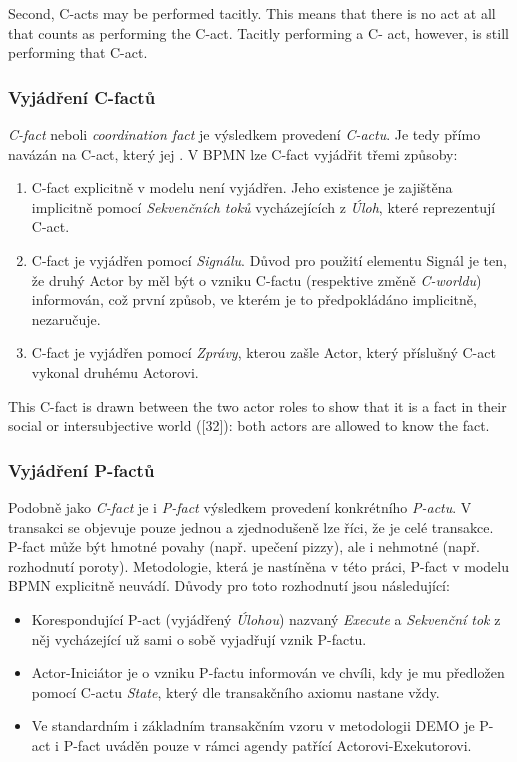 \documentclass[]{article}
\begin{document}
Second, C-acts may be performed tacitly. This means that there is no act at all that counts as performing the C-act. Tacitly performing a C- act, however, is still performing that C-act.

\subsubsection{Vyjádření C-factů}
\textit{C-fact} neboli \textit{coordination fact} je výsledkem provedení \textit{C-actu}. Je tedy přímo navázán na C-act, který jej . V BPMN lze C-fact vyjádřit třemi způsoby:

\begin{enumerate}
\item C-fact explicitně v modelu není vyjádřen. Jeho existence je zajištěna implicitně pomocí \textit{Sekvenčních toků} vycházejících z \textit{Úloh}, které reprezentují C-act.
\item C-fact je vyjádřen pomocí \textit{Signálu}. Důvod pro použití elementu Signál je ten, že druhý Actor by měl být o vzniku C-factu (respektive změně \textit{C-worldu}) informován, což první způsob, ve kterém je to předpokládáno implicitně, nezaručuje.
\item C-fact je vyjádřen pomocí \textit{Zprávy}, kterou zašle Actor, který příslušný C-act vykonal druhému Actorovi.
\end{enumerate}

This C-fact is drawn between the two actor roles to show that it is a fact in their social or intersubjective world ([32]): both actors are allowed to know the fact. 

\subsubsection{Vyjádření P-factů}
Podobně jako \textit{C-fact} je i \textit{P-fact} výsledkem provedení konkrétního \textit{P-actu}. V transakci se objevuje pouze jednou a zjednodušeně lze říci, že je  celé transakce. P-fact může být hmotné povahy (např. upečení pizzy), ale i nehmotné (např. rozhodnutí poroty). Metodologie, která je nastíněna v této práci, P-fact v modelu BPMN explicitně neuvádí. Důvody pro toto rozhodnutí jsou následující:

\begin{itemize}
\item Korespondující P-act (vyjádřený \textit{Úlohou}) nazvaný \textit{Execute} a \textit{Sekvenční tok} z něj vycházející už sami o sobě vyjadřují vznik P-factu.
\item Actor-Iniciátor je o vzniku P-factu informován ve chvíli, kdy je mu předložen pomocí C-actu \textit{State}, který dle transakčního axiomu nastane vždy.
\item Ve standardním i základním transakčním vzoru v metodologii DEMO je P-act i P-fact uváděn pouze v rámci agendy patřící Actorovi-Exekutorovi.
\end{itemize}
\end{document}
